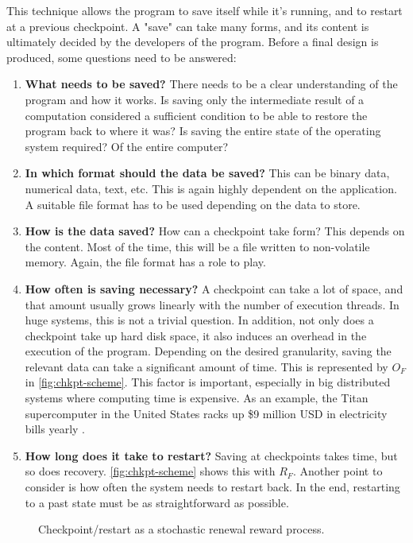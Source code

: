 {This technique allows the program to save itself while it's running, and to restart at a previous checkpoint. A "save" can take many forms, and its content is ultimately decided by the developers of the program. Before a final design is produced, some questions need to be answered:
\begin{enumerate}
	\item \textbf{What needs to be saved?} There needs to be a clear understanding of the program and how it works. Is saving only the intermediate result of a computation considered a sufficient condition to be able to restore the program back to where it was? Is saving the entire state of the operating system required? Of the entire computer? 
	\item \textbf{In which format should the data be saved?} This can be binary data, numerical data, text, etc. This is again highly dependent on the application. A suitable file format has to be used depending on the data to store.
	\item \textbf{How is the data saved?} How can a checkpoint take form? This depends on the content. Most of the time, this will be a file written to non-volatile memory. Again, the file format has a role to play.
	\item \textbf{How often is saving necessary?} A checkpoint can take a lot of space, and that amount usually grows linearly with the number of execution threads. In huge systems, this is not a trivial question. In addition, not only does a checkpoint take up hard disk space, it also induces an overhead in the execution of the program. Depending on the desired granularity, saving the relevant data can take a significant amount of time. This is represented by $O_F$ in \autoref{fig:chkpt-scheme}. This factor is important, especially in big distributed systems where computing time is expensive. As an example, the Titan supercomputer in the United States racks up \$9 million USD in electricity bills yearly \cite{online:henn}.
	\item \textbf{How long does it take to restart?} Saving at checkpoints takes time, but so does recovery. \autoref{fig:chkpt-scheme} shows this with $R_F$. Another point to consider is how often the system needs to restart back. In the end, restarting to a past state must be as straightforward as possible.
\end{enumerate}
\begin{figure}[H]
	\centering
	
	\caption{Checkpoint/restart as a stochastic renewal reward process.\cite{misc:chkpt-scheme}}
	\label{fig:chkpt-scheme}
\end{figure}

}
